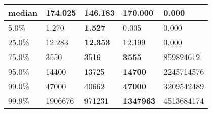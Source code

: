 \begin{table}[H]
\begin{tabular}{|l|m{10em}|m{10em}|m{10em}|m{10em}|}
\hline median & 174.025 & 146.183 & \bfseries 170.000 & \cellcolor[rgb]{0.9, 0.54, 0.52} 0.000 \\
\hline 5.0\% & 1.270 & \bfseries 1.527 & 0.005 & \cellcolor[rgb]{0.9, 0.54, 0.52} 0.000 \\
\hline 25.0\% & 12.283 & \bfseries 12.353 & 12.199 & \cellcolor[rgb]{0.9, 0.54, 0.52} 0.000 \\
\hline 75.0\% & 3550 & 3516 & \bfseries 3555 & \cellcolor[rgb]{0.9, 0.54, 0.52} 859824612 \\
\hline 95.0\% & 14400 & 13725 & \bfseries 14700 & \cellcolor[rgb]{0.9, 0.54, 0.52} 2245714576 \\
\hline 99.0\% & 47000 & 40662 & \bfseries 47000 & \cellcolor[rgb]{0.9, 0.54, 0.52} 3209542489 \\
\hline 99.9\% & 1906676 & 971231 & \bfseries 1347963 & \cellcolor[rgb]{0.9, 0.54, 0.52} 4513684174 \\
\hline
\end{tabular}
\end{table}
